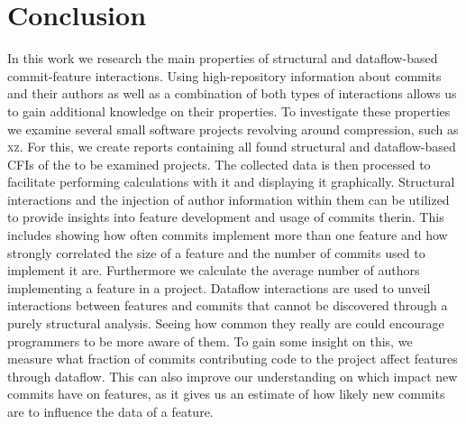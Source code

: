 \section{Conclusion}\label{ch:conclusion}

In this work we research the main properties of structural and dataflow-based commit-feature interactions.
Using high-repository information about commits and their authors as well as a combination of both types of interactions allows us to gain additional knowledge on their properties.
To investigate these properties we examine several small software projects revolving around compression, such as \textsc{xz}.
For this, we create reports containing all found structural and dataflow-based CFIs of the to be  examined projects.
The collected data is then processed to facilitate performing calculations with it and displaying it graphically.
Structural interactions and the injection of author information within them can be utilized to provide insights into feature development and usage of commits therin.
This includes showing how often commits implement more than one feature and how strongly correlated the size of a feature and the number of commits used to implement it are.
Furthermore we calculate the average number of authors implementing a feature in a project.
Dataflow interactions are used to unveil interactions between features and commits that cannot be discovered through a purely structural analysis.
Seeing how common they really are could encourage programmers to be more aware of them.
To gain some insight on this, we measure what fraction of commits contributing code to the project affect features through dataflow.
This can also improve our understanding on which impact new commits have on features, as it gives us an estimate of how likely new commits are to influence the data of a feature. 



\iffalse
Research involving interactions inbetween features and commits has shown that investigating interactions between program entities is a topic worthy of study.
For example, Sattler et al used dataflow commit interactions to allow for a more detailed understanding of author interactions in software projects. 
Commit interactions also make it possible to identify seemingly insignificant changes that have a central impact on the program.
Kolesnikov et al provides further indication for the wide range of subjects interactions can be used for.
Particularly, they argued that control-flow interactions between features can help predict performance interactions between them. 

We extend VaRA to implement the detection of structural and dataflow-based commit-feature interactions.
As we want to investigate several projects, we create reports containing all found interactions for them.
These reports are created inside the VaRA-Tool-Suite and contain either all structural or dataflow-based interactions of a software project.
The VaRA-Tool-Suite also allows use to work with the collected data and enrich it with high-repository information, such as information on which author a commit belongs to.
\fi
